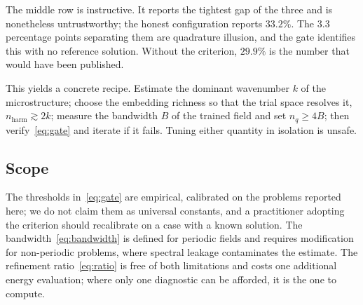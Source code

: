 The middle row is instructive. It reports the tightest gap of the three and
is nonetheless untrustworthy; the honest configuration reports $33.2\%$.
The $3.3$ percentage points separating them are quadrature illusion, and
the gate identifies this with no reference solution. Without the criterion,
$29.9\%$ is the number that would have been published.

This yields a concrete recipe. Estimate the dominant wavenumber $k$ of the
microstructure; choose the embedding richness so that the trial space
resolves it, $n_{\mathrm{harm}} \gtrsim 2k$; measure the bandwidth $B$ of
the trained field and set $n_q \ge 4B$; then verify~\eqref{eq:gate} and
iterate if it fails. Tuning either quantity in isolation is unsafe.

\subsection{Scope}
\label{sec:quad:scope}

The thresholds in~\eqref{eq:gate} are empirical, calibrated on the problems
reported here; we do not claim them as universal constants, and a
practitioner adopting the criterion should recalibrate on a case with a
known solution. The bandwidth~\eqref{eq:bandwidth} is defined for periodic
fields and requires modification for non-periodic problems, where spectral
leakage contaminates the estimate. The refinement ratio~\eqref{eq:ratio} is
free of both limitations and costs one additional energy evaluation; where
only one diagnostic can be afforded, it is the one to compute.
